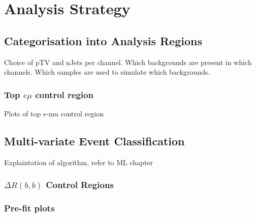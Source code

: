 \chapter{Analysis Strategy}%
\label{ch:strategy}
\section{Categorisation into Analysis Regions}
\label{sec:ana-regions}
Choice of pTV and nJets per channel.
Which backgrounds are present in which channels.
Which samples are used to simulate which backgrounds.
\subsection{Top \texorpdfstring{$e \mu$}{e mu} control region}%
\label{sec:topemucr}
Plots of top e-mu control region
\section{Multi-variate Event Classification}%
\label{sec:mva}
Explaintation of algorithm, refer to ML chapter



\subsection{\texorpdfstring{$\Delta R(b,b)$}{DRbb} Control Regions}%
\label{sec:control-region-defintions}

\subsection{Pre-fit plots}











